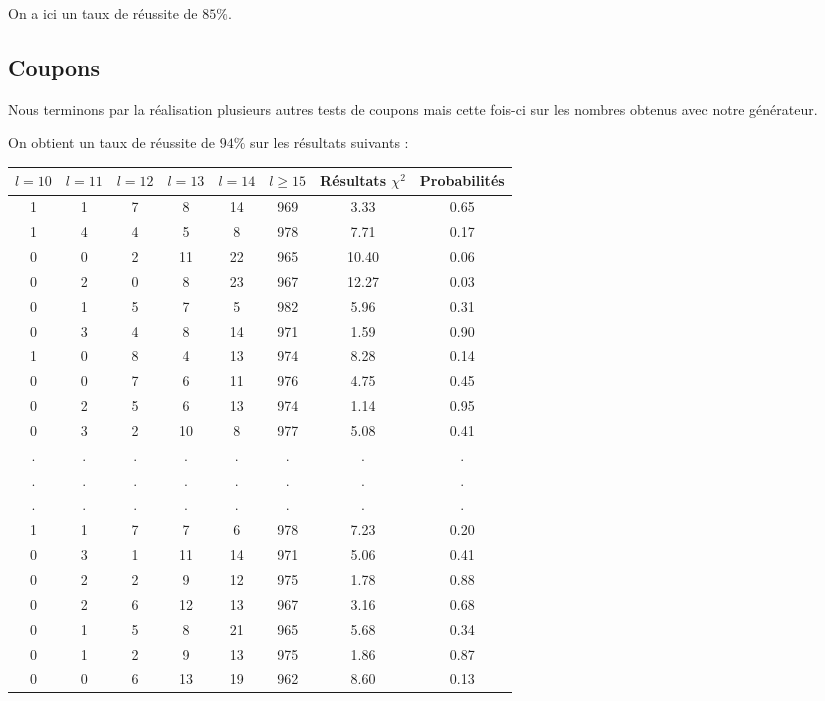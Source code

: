 \documentclass[12pt,a4paper]{article}
\begin{document}
On a ici un taux de réussite de $85\%$.

\subsection*{Coupons}

Nous terminons par la réalisation plusieurs autres tests de coupons mais
cette fois-ci sur les nombres obtenus avec notre générateur.

On obtient un taux de réussite de $94\%$ sur les résultats suivants :

\begin{center}
\begin{tabular}{|c|c|c|c|c|c|c|c|}
\hline
$l = 10$ & $l = 11$ & $l = 12$ & $l = 13$ & $l = 14$ & $l \geq 15$ & Résultats $\chi^2$ & Probabilités \\ \hline
1 & 1 & 7 & 8 & 14 & 969 &  3.33 &  0.65\\ \hline
1 & 4 & 4 & 5 & 8 & 978 &  7.71 &  0.17\\ \hline
0 & 0 & 2 & 11 & 22 & 965 & 10.40 &  0.06\\ \hline
0 & 2 & 0 & 8 & 23 & 967 & 12.27 &  0.03\\ \hline
0 & 1 & 5 & 7 & 5 & 982 &  5.96 &  0.31\\ \hline
0 & 3 & 4 & 8 & 14 & 971 &  1.59 &  0.90\\ \hline
1 & 0 & 8 & 4 & 13 & 974 &  8.28 &  0.14\\ \hline
0 & 0 & 7 & 6 & 11 & 976 &  4.75 &  0.45\\ \hline
0 & 2 & 5 & 6 & 13 & 974 &  1.14 &  0.95\\ \hline
0 & 3 & 2 & 10 & 8 & 977 &  5.08 &  0.41\\ \hline
 . & . & . & . & . & . & . & .\\ \hline
 . & . & . & . & . & . & . & .\\ \hline
 . & . & . & . & . & . & . & .\\ \hline
1 & 1 & 7 & 7 & 6 & 978 &  7.23 &  0.20\\ \hline
0 & 3 & 1 & 11 & 14 & 971 &  5.06 &  0.41\\ \hline
0 & 2 & 2 & 9 & 12 & 975 &  1.78 &  0.88\\ \hline
0 & 2 & 6 & 12 & 13 & 967 &  3.16 &  0.68\\ \hline
0 & 1 & 5 & 8 & 21 & 965 &  5.68 &  0.34\\ \hline
0 & 1 & 2 & 9 & 13 & 975 &  1.86 &  0.87\\ \hline
0 & 0 & 6 & 13 & 19 & 962 &  8.60 &  0.13\\ \hline

\end{tabular}
\end{center}
\end{document}
